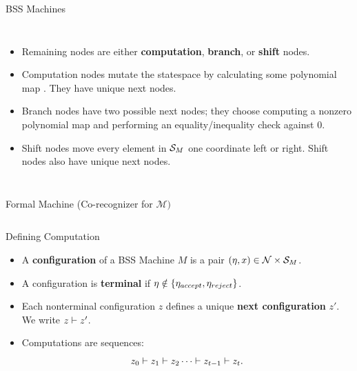 \documentclass[c]{beamer}
\begin{document}
\begin{frame}{BSS Machines}
  
  \begin{columns}
    

    \scriptsize

    \begin{itemize}
      \setlength{\itemsep}{2mm}
    \item Remaining nodes are either \textbf{computation},
      \textbf{branch}, or \textbf{shift} nodes.
    \item Computation nodes mutate the statespace by calculating some
      polynomial map . They have unique next
      nodes.
    \item Branch nodes have two possible next nodes; they choose computing
      a nonzero polynomial map  and performing
      an equality/inequality check against $0$.
    \item Shift nodes move every element in $\mathcal{S}_M$ one
      coordinate left or right.  Shift nodes also have unique next
      nodes.
    \end{itemize}
    \scaletopagewidth[.9]{\mandelrecpII{}}
    
  \end{columns}
  
 \end{frame}

\begin{frame}{Formal Machine (Co-recognizer for $\mathcal{M})$}
  
  \begin{columns}
    \begin{center}
      \scaletopagewidth[.9]{\mandlegend{}}
    \end{center}
    
    \begin{center}
      \scaletopagewidth[.9]{\mandelrecfull{}}
    \end{center}
  \end{columns}

\end{frame}

\begin{frame}{Defining Computation}

  \begin{itemize}
    \setlength{\itemsep}{3mm}
  \item[] A \textbf{configuration} of a BSS Machine $M$ is a pair
    $(\eta, x) \in \mathcal{N} \times \mathcal{S}_M$.
  \item[] A configuration is \textbf{terminal} if $\eta \notin
    \{\eta_{accept}, \eta_{reject}\}$.
  \item[] Each nonterminal configuration $z$ defines a unique \textbf{next
      configuration} $z'$.  We write $z \vdash z'$.
  \item[] Computations are sequences:
    $$z_0 \vdash z_1 \vdash z_2 \cdots \vdash z_{t-1} \vdash z_t.$$
  \end{itemize}
\end{frame}
\end{document}
